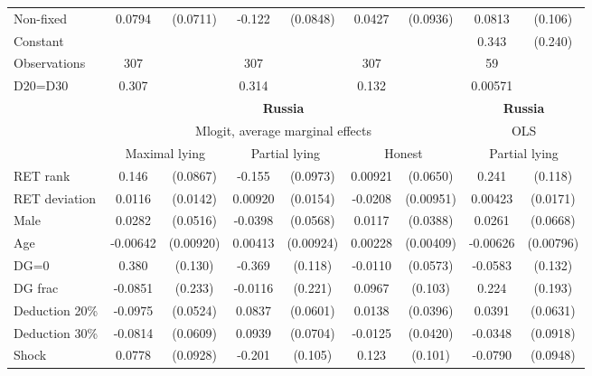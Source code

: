 \begin{tabular}{l|cccccc|cc}
Non-fixed     &   0.0794         & (0.0711)&   -0.122         & (0.0848)&   0.0427         & (0.0936)&   0.0813         &  (0.106)\\
Constant        &                  &         &                  &         &                  &         &    0.343         &  (0.240)\\
\hline
Observations    &      307         &         &      307         &         &      307         &         &       59         &         \\
D20=D30         &    0.307         &         &    0.314         &         &    0.132         &         &  0.00571         &         \\
\hline\hline
&\multicolumn{6}{c|}{\bf Russia}&\multicolumn{2}{c}{\bf Russia}\\ &\multicolumn{6}{c|}{Mlogit, average marginal effects }&\multicolumn{2}{c}{OLS}\\
                &\multicolumn{2}{c}{Maximal lying}&\multicolumn{2}{c}{Partial lying}&\multicolumn{2}{c|}{Honest}  &\multicolumn{2}{c}{Partial lying}\\
\hline
RET rank        &    0.146\sym{*}  & (0.0867)&   -0.155         & (0.0973)&  0.00921         & (0.0650)&    0.241\sym{**} &  (0.118)\\
RET deviation   &   0.0116         & (0.0142)&  0.00920         & (0.0154)&  -0.0208\sym{**} &(0.00951)&  0.00423         & (0.0171)\\
Male            &   0.0282         & (0.0516)&  -0.0398         & (0.0568)&   0.0117         & (0.0388)&   0.0261         & (0.0668)\\
Age             & -0.00642         &(0.00920)&  0.00413         &(0.00924)&  0.00228         &(0.00409)& -0.00626         &(0.00796)\\
DG=0          &    0.380\sym{***}&  (0.130)&   -0.369\sym{***}&  (0.118)&  -0.0110         & (0.0573)&  -0.0583         &  (0.132)\\
DG frac         &  -0.0851         &  (0.233)&  -0.0116         &  (0.221)&   0.0967         &  (0.103)&    0.224         &  (0.193)\\
Deduction 20\%&  -0.0975\sym{*}  & (0.0524)&   0.0837         & (0.0601)&   0.0138         & (0.0396)&   0.0391         & (0.0631)\\
Deduction 30\%&  -0.0814         & (0.0609)&   0.0939         & (0.0704)&  -0.0125         & (0.0420)&  -0.0348         & (0.0918)\\
Shock         &   0.0778         & (0.0928)&   -0.201\sym{*}  &  (0.105)&    0.123         &  (0.101)&  -0.0790         & (0.0948)\\

\end{tabular}
